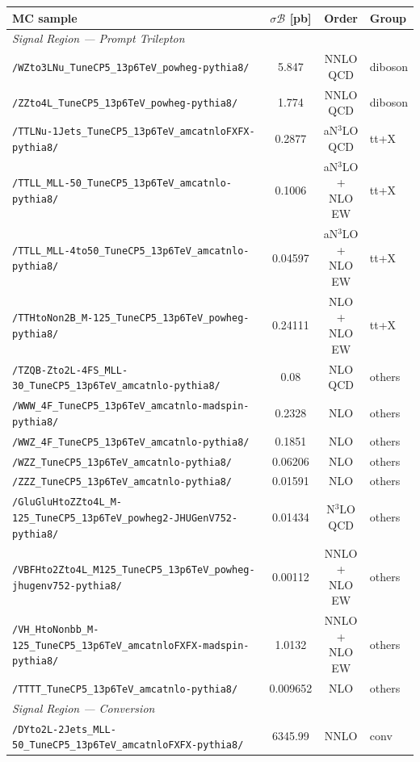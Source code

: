 \begin{table}
  \centering
  \footnotesize
  \begin{tabular}{lccl}
  \hline\hline
  \textbf{MC sample} & \textbf{$\sigma\mathcal{B}$ [pb]} & \textbf{Order} & \textbf{Group} \\
  \hline
  \multicolumn{4}{l}{\textit{Signal Region — Prompt Trilepton}} \\
  \texttt{/WZto3LNu\_TuneCP5\_13p6TeV\_powheg-pythia8/} & 5.847 & NNLO QCD & diboson \\
  \texttt{/ZZto4L\_TuneCP5\_13p6TeV\_powheg-pythia8/} & 1.774 & NNLO QCD & diboson \\
  \texttt{/TTLNu-1Jets\_TuneCP5\_13p6TeV\_amcatnloFXFX-pythia8/} & 0.2877 & aN$^{3}$LO QCD & tt+X \\
  \texttt{/TTLL\_MLL-50\_TuneCP5\_13p6TeV\_amcatnlo-pythia8/} & 0.1006 & aN$^{3}$LO + NLO EW & tt+X \\
  \texttt{/TTLL\_MLL-4to50\_TuneCP5\_13p6TeV\_amcatnlo-pythia8/} & 0.04597 & aN$^{3}$LO + NLO EW & tt+X \\
  \texttt{/TTHtoNon2B\_M-125\_TuneCP5\_13p6TeV\_powheg-pythia8/} & 0.24111 & NLO + NLO EW & tt+X \\
  \texttt{/TZQB-Zto2L-4FS\_MLL-30\_TuneCP5\_13p6TeV\_amcatnlo-pythia8/} & 0.08 & NLO QCD & others \\
  \texttt{/WWW\_4F\_TuneCP5\_13p6TeV\_amcatnlo-madspin-pythia8/} & 0.2328 & NLO & others \\
  \texttt{/WWZ\_4F\_TuneCP5\_13p6TeV\_amcatnlo-pythia8/} & 0.1851 & NLO & others \\
  \texttt{/WZZ\_TuneCP5\_13p6TeV\_amcatnlo-pythia8/} & 0.06206 & NLO & others \\
  \texttt{/ZZZ\_TuneCP5\_13p6TeV\_amcatnlo-pythia8/} & 0.01591 & NLO & others \\
  \texttt{/GluGluHtoZZto4L\_M-125\_TuneCP5\_13p6TeV\_powheg2-JHUGenV752-pythia8/} & 0.01434 & N$^{3}$LO QCD & others \\
  \texttt{/VBFHto2Zto4L\_M125\_TuneCP5\_13p6TeV\_powheg-jhugenv752-pythia8/} & 0.00112 & NNLO + NLO EW & others \\
  \texttt{/VH\_HtoNonbb\_M-125\_TuneCP5\_13p6TeV\_amcatnloFXFX-madspin-pythia8/} & 1.0132 & NNLO + NLO EW & others \\
  \texttt{/TTTT\_TuneCP5\_13p6TeV\_amcatnlo-pythia8/} & 0.009652 & NLO & others \\
  \hline
  \multicolumn{4}{l}{\textit{Signal Region — Conversion}} \\
  \texttt{/DYto2L-2Jets\_MLL-50\_TuneCP5\_13p6TeV\_amcatnloFXFX-pythia8/} & 6345.99 & NNLO & conv \\

\end{tabular}
\end{table}
